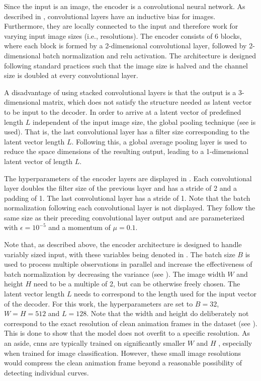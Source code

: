 Since the input is an image, the encoder is a convolutional neural network. As described in , convolutional layers have an inductive bias for images. Furthermore, they are locally connected to the input and therefore work for varying input image sizes (i.e., resolutions). The encoder consists of 6 blocks, where each block is formed by a 2-dimensional convolutional layer, followed by 2-dimensional batch normalization and \gls{relu} activation. The architecture is designed following standard practices such that the image size is halved and the channel size is doubled at every convolutional layer.

A disadvantage of using stacked convolutional layers is that the output is a 3-dimensional matrix, which does not satisfy the structure needed as latent vector to be input to the decoder. In order to arrive at a latent vector of predefined length $L$ independent of the input image size, the global pooling technique (see  is used). That is, the last convolutional layer has a filter size corresponding to the latent vector length $L$. Following this, a global average pooling layer is used to reduce the space dimensions of the resulting output, leading to a 1-dimensional latent vector of length $L$.

The hyperparameters of the encoder layers are displayed in . Each convolutional layer doubles the filter size of the previous layer and has a stride of 2 and a padding of 1. The last convolutional layer has a stride of 1. Note that the batch normalization following each convolutional layer is not displayed. They follow the same size as their preceding convolutional layer output and are parameterized with $\epsilon=10^{-5}$ and a momentum of $\mu=0.1$.

Note that, as described above, the encoder architecture is designed to handle variably sized input, with these variables being denoted in . The batch size $B$ is used to process multiple observations in parallel and increase the effectiveness of batch normalization by decreasing the variance (see ). The image width $W$ and height $H$ need to be a multiple of 2, but can be otherwise freely chosen. The latent vector length $L$ needs to correspond to the length used for the input vector of the decoder. For this work, the hyperparameters are set to $B=32$,  $W=H=512$ and $L=128$. Note that the width and height do deliberately not correspond to the exact resolution of clean animation frames in the dataset (see ). This is done to show that the model does not overfit to a specific resolution. As an aside, \glspl{cnn} are typically trained on significantly smaller $W$ and $H$ \citep{DBLP:conf/cvpr/HeZRS16}, especially when trained for image classification. However, these small image resolutions would compress the clean animation frame beyond a reasonable possibility of detecting individual curves.

